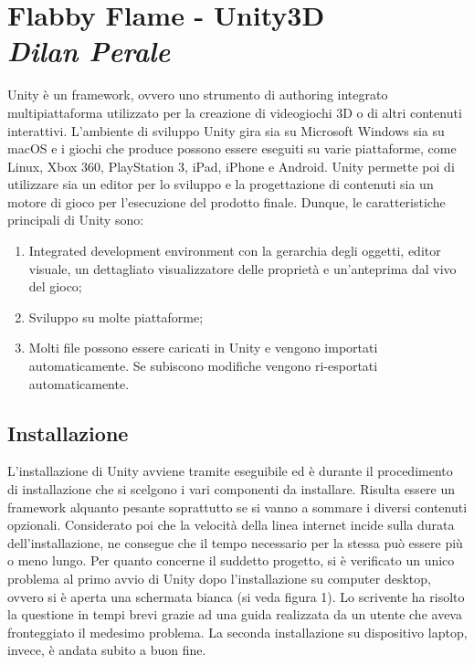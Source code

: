 
\newpage
\section{Flabby Flame - Unity3D\\{\small \emph{Dilan Perale}}}
\label{sec:unity}
Unity è un framework, ovvero uno strumento di authoring integrato multipiattaforma utilizzato per la creazione di videogiochi 3D o di altri contenuti interattivi. 
L'ambiente di sviluppo Unity gira sia su Microsoft Windows sia su macOS e i giochi che produce possono essere eseguiti su varie piattaforme, come Linux, Xbox 360, PlayStation 3, iPad, iPhone e Android. 
Unity permette poi di utilizzare sia un editor per lo sviluppo e la progettazione di contenuti sia un motore di gioco per l'esecuzione del prodotto finale. 
Dunque, le caratteristiche principali di Unity sono:
\begin{enumerate}
			\item Integrated development environment con la gerarchia degli oggetti, editor visuale, un dettagliato visualizzatore delle proprietà e un'anteprima dal vivo del gioco;
			\item Sviluppo su molte piattaforme;
			\item Molti file possono essere caricati in Unity e vengono importati automaticamente. Se subiscono modifiche vengono ri-esportati automaticamente.
\end{enumerate}

\subsection{Installazione}

L’installazione di Unity avviene tramite eseguibile ed è durante il procedimento di installazione che si scelgono i vari componenti da installare. Risulta essere un framework alquanto pesante soprattutto se si vanno a sommare i diversi contenuti opzionali. Considerato poi che la velocità della linea internet incide sulla durata dell’installazione, ne consegue che il tempo necessario per la stessa può essere più o meno lungo.
Per quanto concerne il suddetto progetto, si è verificato un unico problema al primo avvio di Unity dopo l’installazione su computer desktop, ovvero si è aperta una schermata bianca (si veda figura 1). Lo scrivente ha risolto la questione in tempi brevi grazie ad una guida realizzata da un utente che aveva fronteggiato il medesimo problema. La seconda installazione su dispositivo laptop, invece, è andata subito a buon fine.

